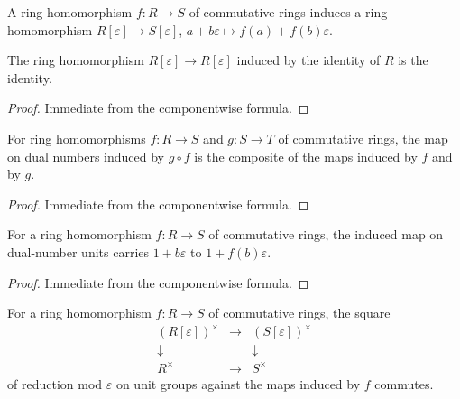 \begin{definition}\leanok
  \label{def:dual_number_map}
  A ring homomorphism \(f : R \to S\) of commutative rings induces a
  ring homomorphism
  \(R[\varepsilon] \to S[\varepsilon]\),
  \(a + b\varepsilon \mapsto f(a) + f(b)\varepsilon\).
\end{definition}

\begin{lemma}\leanok
  \label{lem:dual_number_map_id}
  The ring homomorphism \(R[\varepsilon] \to R[\varepsilon]\) induced
  by the identity of \(R\) is the identity.
\end{lemma}

\begin{proof}\leanok
  Immediate from the componentwise formula.
\end{proof}

\begin{lemma}\leanok
  \label{lem:dual_number_map_comp}
  For ring homomorphisms \(f : R \to S\) and \(g : S \to T\) of
  commutative rings, the map on dual numbers induced by
  \(g \circ f\) is the composite of the maps induced by \(f\) and by
  \(g\).
\end{lemma}

\begin{proof}\leanok
  Immediate from the componentwise formula.
\end{proof}

\begin{lemma}\leanok
  \label{lem:dual_number_map_trunc_exp}
  For a ring homomorphism \(f : R \to S\) of commutative rings, the
  induced map on dual-number units carries \(1 + b\varepsilon\) to
  \(1 + f(b)\varepsilon\).
\end{lemma}

\begin{proof}\leanok
  Immediate from the componentwise formula.
\end{proof}

\begin{lemma}\leanok
  \label{lem:dual_number_units_fst_natural}
  For a ring homomorphism \(f : R \to S\) of commutative rings, the
  square
  \[
    \begin{array}{ccc}
      (R[\varepsilon])^{\times} & \longrightarrow &
        (S[\varepsilon])^{\times} \\
      \downarrow & & \downarrow \\
      R^{\times} & \longrightarrow & S^{\times}
    \end{array}
  \]
  of reduction mod \(\varepsilon\) on unit groups against the maps
  induced by \(f\) commutes.
\end{lemma}

